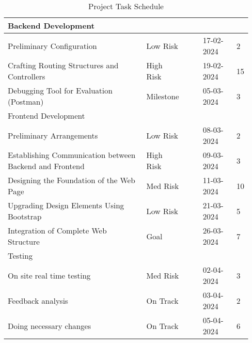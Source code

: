 \begin{table}[htbp]
\centering
\footnotesize
\begin{tabular}{|p{2.5cm}|p{2cm}|p{2cm}|p{2cm}|p{2.5cm}|p{2.5cm}|}
\hline
Backend Development & & & & & \\
\hline
Preliminary Configuration & Low Risk & & & 17-02-2024 & 2 \\
Crafting Routing Structures and Controllers & High Risk & & & 19-02-2024 & 15 \\
Debugging Tool for Evaluation (Postman) & Milestone & & & 05-03-2024 & 3 \\
\hline
Frontend Development & & & & & \\
\hline
Preliminary Arrangements & Low Risk & & & 08-03-2024 & 2 \\
Establishing Communication between Backend and Frontend & High Risk & & & 09-03-2024 & 3 \\
Designing the Foundation of the Web Page & Med Risk & & & 11-03-2024 & 10 \\
Upgrading Design Elements Using Bootstrap & Low Risk & & & 21-03-2024 & 5 \\
Integration of Complete Web Structure & Goal & & & 26-03-2024 & 7 \\
\hline
Testing & & & & & \\
\hline
On site real time testing & Med Risk & & & 02-04-2024 & 3 \\
Feedback analysis & On Track & & & 03-04-2024 & 2 \\
Doing necessary changes & On Track & & & 05-04-2024 & 6 \\
\hline
\end{tabular}
\caption{Project Task Schedule}
\label{tab:tasks}
\end{table}

